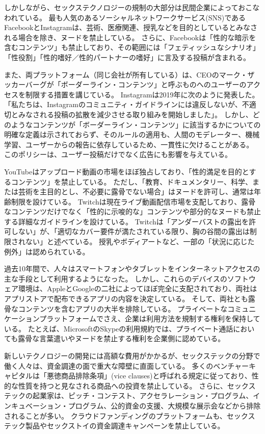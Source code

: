 \documentclass[paper=a4,book,openany]{jlreq} \usepackage{mystyle}
\begin{document}
しかしながら、セックステクノロジーの規制の大部分は民間企業によっておこなわれている。
最も人気のあるソーシャルネットワークサービス(SNS)であるFacebookとInstagramは、芸術、医療関連、授乳などを目的としているとみなされる場合を除き、ヌードを禁止している。
さらに、Facebookは「性的な暗示を含むコンテンツ」も禁止しており、その範囲には「フェティッシュなシナリオ」「性役割」「性的嗜好／性的パートナーの嗜好」に言及する投稿が含まれる。

また、両プラットフォーム（同じ会社が所有している）は、CEOのマーク・ザッカーバーグが「ボーダーライン・コンテンツ」と呼ぶものへのユーザーのアクセスを制限する措置を講じている。
Instagramは2019年に次のように発表した。
「私たちは、Instagramのコミュニティ・ガイドラインには違反しないが、不適切とみなされる投稿の拡散を減少させる取り組みを開始しました」\citep{constine19:_instag_now_demot_vaguel_inapp_conten}。
しかし、どのようなコンテンツが「ボーダーライン・コンテンツ」に該当するかについての明確な定義は示されておらず、そのルールの適用も、人間のモデレーター、機械学習、ユーザーからの報告に依存しているため、一貫性に欠けることがある。
このポリシーは、ユーザー投稿だけでなく広告にも影響を与えている\citep{kibbe20:_faceb_has_banned_ads_kink}。

YouTubeはアップロード動画の市場をほぼ独占しており、「性的満足を目的とするコンテンツ」を禁止している。
ただし、「教育、ドキュメンタリー、科学、または芸術を主目的とし、不必要に露骨でない場合」はヌードを許可し、通常は年齢制限を設けている。
Twitchは現在ライブ動画配信市場を支配しており、露骨なコンテンツだけでなく「性的に示唆的な」コンテンツや部分的なヌードも禁止する詳細なガイドラインを設けている。
Twitchは「アンダーバストの露出を許可しない」が、「適切なカバー要件が満たされている限り、胸の谷間の露出は制限されない」と述べている。
授乳やボディアートなど、一部の「状況に応じた例外」は認められている\citep{good20:_twitc_has_new_nudit_rules_theyr_detail}。

過去10年間で、人々はスマートフォンやタブレットをインターネットアクセスの主な手段として利用するようになった。
しかし、これらのデバイスのソフトウェア環境は、AppleとGoogleの二社によってほぼ完全に支配されており、両社はアプリストアで配布できるアプリの内容を決定している。
そして、両社とも露骨なコンテンツを含むアプリの大半を排除している。
プライベートなコミュニケーションプラットフォームでさえ、企業は利用方法を規制する権利を保持している。
たとえば、MicrosoftのSkypeの利用規約では、プライベート通話においても露骨な言葉遣いやヌードを禁止する権利を企業側に認めている\citep{smith18:_micros_ban_offen_languag_skype}。

新しいテクノロジーの開発には高額な費用がかかるが、セックステックの分野で働く人々は、資金調達の面で重大な障壁に直面している。
多くのベンチャーキャピタルは「{悪徳商品排除条項}」(vice clauses)と呼ばれる規定に従っており、性的な性質を持つと見なされる商品への投資を禁止している\citep{davis19:_compan_ventur_capit_isnt_allow_inves_in}。
さらに、セックステックの起業家は、ピッチ・コンテスト、アクセラレーション・プログラム、インキュベーション・プログラム、公的資金の支援、大規模な展示会などから排除されることが多い\citep{fox19:_vibrat_center_tech_sexis_contr}。
クラウドファンディングのプラットフォームも、セックステック製品やセックストイの資金調達キャンペーンを禁止している\citep{manning17:_sextec_revol_will_not_be_crowd}。
\end{document}
